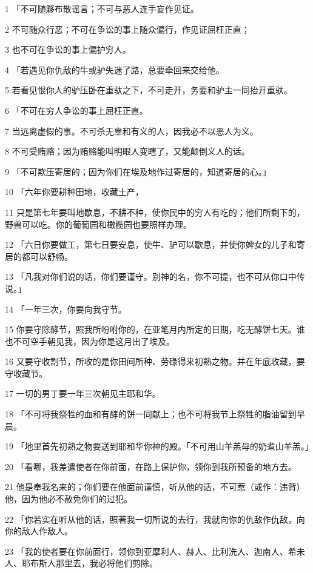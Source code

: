 \par 1 「不可随夥布散谣言；不可与恶人连手妄作见证。
\par 2 不可随众行恶；不可在争讼的事上随众偏行，作见证屈枉正直；
\par 3 也不可在争讼的事上偏护穷人。
\par 4 「若遇见你仇敌的牛或驴失迷了路，总要牵回来交给他。
\par 5 若看见恨你人的驴压卧在重驮之下，不可走开，务要和驴主一同抬开重驮。
\par 6 「不可在穷人争讼的事上屈枉正直。
\par 7 当远离虚假的事。不可杀无辜和有义的人，因我必不以恶人为义。
\par 8 不可受贿赂；因为贿赂能叫明眼人变瞎了，又能颠倒义人的话。
\par 9 「不可欺压寄居的；因为你们在埃及地作过寄居的，知道寄居的心。」
\par 10 「六年你要耕种田地，收藏土产，
\par 11 只是第七年要叫地歇息，不耕不种，使你民中的穷人有吃的；他们所剩下的，野兽可以吃。你的葡萄园和橄榄园也要照样办理。
\par 12 「六日你要做工，第七日要安息，使牛、驴可以歇息，并使你婢女的儿子和寄居的都可以舒畅。
\par 13 「凡我对你们说的话，你们要谨守。别神的名，你不可提，也不可从你口中传说。」
\par 14 「一年三次，你要向我守节。
\par 15 你要守除酵节，照我所吩咐你的，在亚笔月内所定的日期，吃无酵饼七天。谁也不可空手朝见我，因为你是这月出了埃及。
\par 16 又要守收割节，所收的是你田间所种、劳碌得来初熟之物。并在年底收藏，要守收藏节。
\par 17 一切的男丁要一年三次朝见主耶和华。
\par 18 「不可将我祭牲的血和有酵的饼一同献上；也不可将我节上祭牲的脂油留到早晨。
\par 19 「地里首先初熟之物要送到耶和华你神的殿。「不可用山羊羔母的奶煮山羊羔。」
\par 20 「看哪，我差遣使者在你前面，在路上保护你，领你到我所预备的地方去。
\par 21 他是奉我名来的；你们要在他面前谨慎，听从他的话，不可惹（或作：违背）他，因为他必不赦免你们的过犯。
\par 22 「你若实在听从他的话，照著我一切所说的去行，我就向你的仇敌作仇敌，向你的敌人作敌人。
\par 23 「我的使者要在你前面行，领你到亚摩利人、赫人、比利洗人、迦南人、希未人、耶布斯人那里去，我必将他们剪除。

